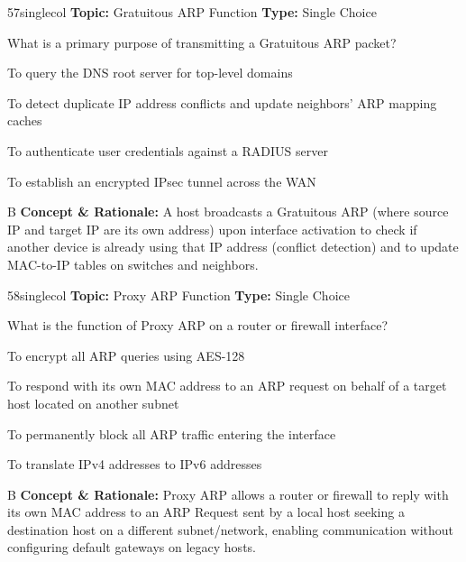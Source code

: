 \begin{qcard}{57}{singlecol}
\textcolor{darkslate!75}{\small\textbf{Topic:} Gratuitous ARP Function \hfill \textbf{Type:} Single Choice}\vspace{0.4em}\par
What is a primary purpose of transmitting a Gratuitous ARP packet?
\begin{qoptions}
\item To query the DNS root server for top-level domains
\item To detect duplicate IP address conflicts and update neighbors' ARP mapping caches
\item To authenticate user credentials against a RADIUS server
\item To establish an encrypted IPsec tunnel across the WAN
\end{qoptions}
\end{qcard}
\nopagebreak
\begin{explainbox}{B}
\textbf{Concept \& Rationale:} A host broadcasts a Gratuitous ARP (where source IP and target IP are its own address) upon interface activation to check if another device is already using that IP address (conflict detection) and to update MAC-to-IP tables on switches and neighbors.
\end{explainbox}

\begin{qcard}{58}{singlecol}
\textcolor{darkslate!75}{\small\textbf{Topic:} Proxy ARP Function \hfill \textbf{Type:} Single Choice}\vspace{0.4em}\par
What is the function of Proxy ARP on a router or firewall interface?
\begin{qoptions}
\item To encrypt all ARP queries using AES-128
\item To respond with its own MAC address to an ARP request on behalf of a target host located on another subnet
\item To permanently block all ARP traffic entering the interface
\item To translate IPv4 addresses to IPv6 addresses
\end{qoptions}
\end{qcard}
\nopagebreak
\begin{explainbox}{B}
\textbf{Concept \& Rationale:} Proxy ARP allows a router or firewall to reply with its own MAC address to an ARP Request sent by a local host seeking a destination host on a different subnet/network, enabling communication without configuring default gateways on legacy hosts.
\end{explainbox}

